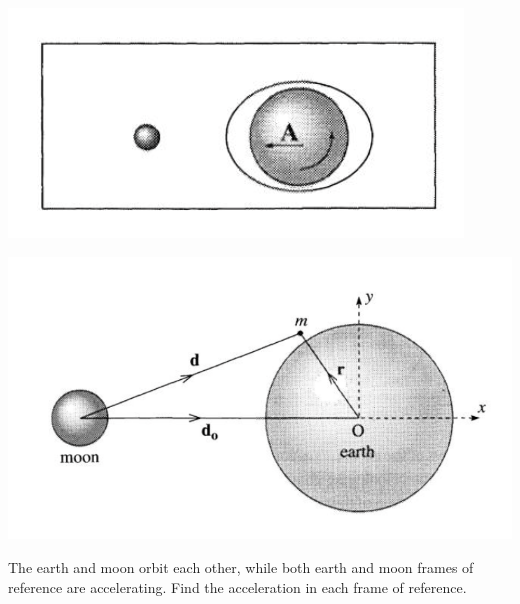 \begin{center}
    \includegraphics[scale=0.75]{Lecture-14/w14-img3.png}
\end{center}
\begin{center}
    \includegraphics[scale=0.75]{Lecture-14/w14-img4.png}
\end{center}
\begin{p}
The earth and moon orbit each other, while both earth and moon frames of reference are accelerating. Find the acceleration in each frame of reference. 
\end{p}
